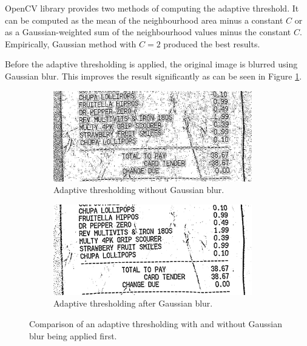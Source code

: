 \documentclass[
  digital, %
  table,   %
  oneside, %
  lof,     %
  lot,     %
]{fithesis3}
\begin{document}
OpenCV library provides two methods of computing the adaptive threshold. It can be computed as the mean of the neighbourhood area minus a constant $C$ or as a Gaussian-weighted sum of the neighbourhood values minus the constant $C$. Empirically, Gaussian method with $C = 2$ produced the best results.

Before the adaptive thresholding is applied, the original image is blurred using Gaussian blur. This improves the result significantly as can be seen in Figure \ref{fig:adaptive_thresholding}.

\begin{figure}
    \centering
    \begin{subfigure}[t]{0.5\textwidth}
      \centering
      \includegraphics[width=0.95\textwidth]{figures/image_processing/adaptive_thresholding_no_blur}
      \caption{Adaptive thresholding without Gaussian blur.}
    \end{subfigure}
    \begin{subfigure}[t]{0.5\textwidth}
      \centering
      \includegraphics[width=0.95\textwidth]{figures/image_processing/adaptive_thresholding}
      \caption{Adaptive thresholding after Gaussian blur.}
    \end{subfigure}
    \caption{Comparison of an adaptive thresholding with and without Gaussian blur being applied first.}
    \label{fig:adaptive_thresholding}
\end{figure}
\end{document}
